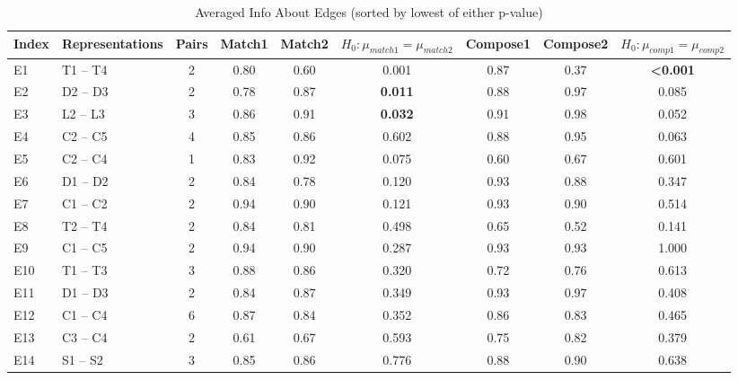 \begin{table*}\begin{small}\begin{center}\caption{Averaged Info About Edges (sorted by lowest of either p-value)}\label{table:testedEdgesTable}\begin{tabular}
{llccccccc}
Index & Representations & Pairs & Match1 & Match2 & $H_0: \mu_{match1} = \mu_{match2}$ & Compose1 & Compose2 &  $H_0: \mu_{comp1} = \mu_{comp2}$ \\
\toprule[0.16em]
E1 & T1 -- T4 & 2 & 0.80 & 0.60 & 0.001 & 0.87 & 0.37 & \textbf{<0.001}\\
E2 & D2 -- D3 & 2 & 0.78 & 0.87 & \textbf{0.011} & 0.88 & 0.97 & 0.085\\
E3 & L2 -- L3 & 3 & 0.86 & 0.91 & \textbf{0.032} & 0.91 & 0.98 & 0.052\\
\midrule[0.16em]
E4 & C2 -- C5 & 4 & 0.85 & 0.86 & 0.602 & 0.88 & 0.95 & {0.063}\\
E5 & C2 -- C4 & 1 & 0.83 & 0.92 & {0.075} & 0.60 & 0.67 & 0.601\\

E6 & D1 -- D2 & 2 & 0.84 & 0.78 & 0.120 & 0.93 & 0.88 & 0.347\\
E7 & C1 -- C2 & 2 & 0.94 & 0.90 & 0.121 & 0.93 & 0.90 & 0.514\\
E8 & T2 -- T4 & 2 & 0.84 & 0.81 & 0.498 & 0.65 & 0.52 & 0.141\\
E9 & C1 -- C5 & 2 & 0.94 & 0.90 & 0.287 & 0.93 & 0.93 & 1.000\\
E10 & T1 -- T3 & 3 & 0.88 & 0.86 & 0.320 & 0.72 & 0.76 & 0.613\\
E11 & D1 -- D3 & 2 & 0.84 & 0.87 & 0.349 & 0.93 & 0.97 & 0.408\\
E12 & C1 -- C4 & 6 & 0.87 & 0.84 & 0.352 & 0.86 & 0.83 & 0.465\\
E13 & C3 -- C4 & 2 & 0.61 & 0.67 & 0.593 & 0.75 & 0.82 & 0.379\\
E14 & S1 -- S2 & 3 & 0.85 & 0.86 & 0.776 & 0.88 & 0.90 & 0.638\\
\bottomrule[0.13em]\end{tabular}\end{center}\end{small}\end{table*}
